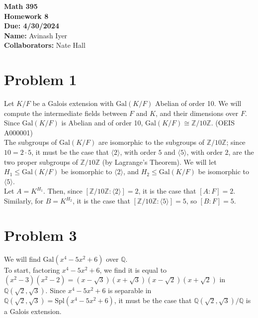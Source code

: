 \documentclass[10pt]{extarticle}
\title{}
\author{}
\date{}
\newcommand{\Q}{\mathbb{Q}}
\newcommand{\Z}{\mathbb{Z}}
\begin{document}
  \begin{center}
    {\bf \Large Math 395 \\[0.1in]Homework 8 \\[0.1in]
    Due: 4/30/2024}\\[.25in]
    {\bf Name:} {Avinash Iyer}\\[0.15in]
    {\bf Collaborators:} {Nate Hall} \\
  \end{center}
  \section{Problem 1}%
  Let $K/F$ be a Galois extension with $\text{Gal}(K/F)$ Abelian of order 10. We will compute the intermediate fields between $F$ and $K$, and their dimensions over $F$.\\

  Since $\text{Gal}(K/F)$ is Abelian and of order 10, $\text{Gal}(K/F)\cong \Z/10\Z$. {\tiny (OEIS A000001)}\\

  The subgroups of $\text{Gal}(K/F)$ are isomorphic to the subgroups of $\Z/10\Z$; since $10 = 2\cdot 5$, it must be the case that $\langle 2 \rangle$, with order $5$ and $\langle 5 \rangle$, with order $2$, are the two proper subgroups of $\Z/10\Z$ (by Lagrange's Theorem). We will let $H_1 \leq \text{Gal}(K/F)$ be isomorphic to $\langle 2 \rangle$, and $H_2 \leq \text{Gal}(K/F)$ be isomorphic to $\langle 5 \rangle$.\\

  Let $A = K^{H_1}$. Then, since $[\Z/10\Z : \langle 2 \rangle] = 2$, it is the case that $[A:F] = 2$. Similarly, for $B = K^{H_2}$, it is the case that $[\Z/10\Z : \langle 5 \rangle] = 5$, so $[B:F] = 5$.
  \section{Problem 3}%
  We will find $\text{Gal}(x^4 - 5x^2 + 6)$ over $\Q$.\\

  To start, factoring $x^4 - 5x^2 + 6$, we find it is equal to $(x^2 - 3)(x^2 - 2) = (x-\sqrt{3})(x+\sqrt{3})(x-\sqrt{2})(x+\sqrt{2})$ in $\Q(\sqrt{2},\sqrt{3})$. Since $x^4 - 5x^2 + 6$ is separable in $\Q(\sqrt{2},\sqrt{3}) = \text{Spl}(x^4 - 5x^2 + 6)$, it must be the case that $\Q(\sqrt{2},\sqrt{3})/\Q$ is a Galois extension.\\
\end{document}
